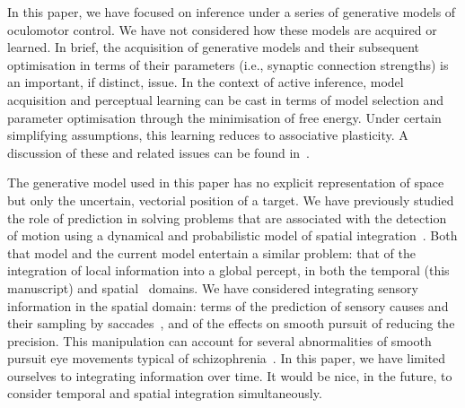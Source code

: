 \documentclass[a4paper]{article} %
\begin{document}
In this paper, we have focused on inference under a series of generative models of oculomotor control. We have not considered how these models are acquired or learned. In brief, the acquisition of generative models and their subsequent optimisation in terms of their parameters (i.e., synaptic connection strengths) is an important, if distinct, issue. In the context of active inference, model acquisition and perceptual learning can be cast in terms of model selection and parameter optimisation through the minimisation of free energy. Under certain simplifying assumptions, this learning reduces to associative plasticity. A discussion of these and related issues can be found in~\citet{Friston08b}.

The generative model used in this paper has no explicit representation of space but only the uncertain, vectorial position of a target. We have previously studied the role of prediction in solving problems that are associated with the detection of motion using a dynamical and probabilistic model of spatial integration~\citep{Perrinet12}. Both that model and the current model entertain a similar problem: that of the integration of local information into a global percept, in both the temporal (this manuscript) and spatial~\citep{Perrinet12} domains. We have considered integrating sensory information in the spatial domain: terms of the prediction of sensory causes and their sampling by saccades~\citep{Friston12a}, and of the effects on smooth pursuit of reducing the precision. This manipulation can account for several abnormalities of smooth pursuit eye movements typical of schizophrenia~\citep{Adams12}. In this paper, we have limited ourselves to integrating information over time. It would be nice, in the future, to consider temporal and spatial integration simultaneously.
\end{document}
